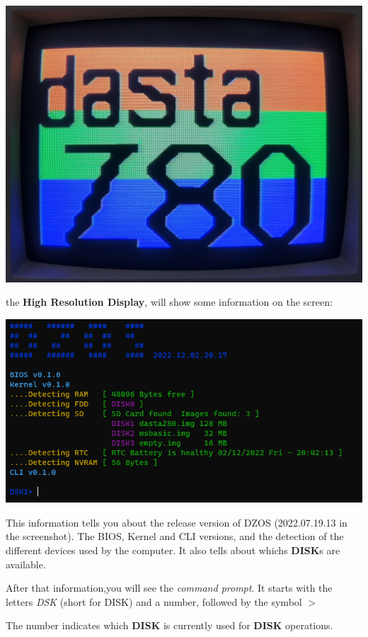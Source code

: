 \documentclass[a4paper,11pt]{article}
\begin{document}
    \includegraphics[scale=0.2]{images/dastaZ80logoOnVDP.png}

    the \textbf{High Resolution Display}, will show some information on the
    screen:

    \includegraphics[scale=0.6]{images/dzOS.png}

    This information tells you about the release version of DZOS (2022.07.19.13
    in the screenshot). The BIOS, Kernel and CLI versions, and the detection of
    the different devices used by the computer. It also tells about whichs 
    \textbf{DISK}s are available.

    After that information,you will see the \textit{command prompt}. It starts
    with the letters \textit{DSK} (short for DISK) and a number, followed by the
    symbol $>$

    The number indicates which \textbf{DISK} is currently used for \textbf{DISK}
    operations.
\end{document}
